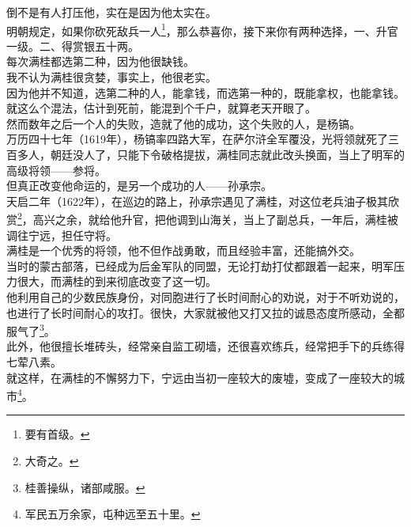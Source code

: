 \begin{multicols}{\theparacolNo}
倒不是有人打压他，实在是因为他太实在。\\

明朝规定，如果你砍死敌兵一人\footnote{要有首级。}，那么恭喜你，接下来你有两种选择，一、升官一级。二、得赏银五十两。\\

每次满桂都选第二种，因为他很缺钱。\\

我不认为满桂很贪婪，事实上，他很老实。\\

因为他并不知道，选第二种的人，能拿钱，而选第一种的，既能拿权，也能拿钱。\\

就这么个混法，估计到死前，能混到个千户，就算老天开眼了。\\

然而数年之后一个人的失败，造就了他的成功，这个失败的人，是杨镐。\\

万历四十七年（1619年），杨镐率四路大军，在萨尔浒全军覆没，光将领就死了三百多人，朝廷没人了，只能下令破格提拔，满桂同志就此改头换面，当上了明军的高级将领——参将。\\

但真正改变他命运的，是另一个成功的人——孙承宗。\\

天启二年（1622年），在巡边的路上，孙承宗遇见了满桂，对这位老兵油子极其欣赏\footnote{大奇之。}，高兴之余，就给他升官，把他调到山海关，当上了副总兵，一年后，满桂被调往宁远，担任守将。\\

满桂是一个优秀的将领，他不但作战勇敢，而且经验丰富，还能搞外交。\\

当时的蒙古部落，已经成为后金军队的同盟，无论打劫打仗都跟着一起来，明军压力很大，而满桂的到来彻底改变了这一切。\\

他利用自己的少数民族身份，对同胞进行了长时间耐心的劝说，对于不听劝说的，也进行了长时间耐心的攻打。很快，大家就被他又打又拉的诚恳态度所感动，全都服气了\footnote{桂善操纵，诸部咸服。}。\\

此外，他很擅长堆砖头，经常亲自监工砌墙，还很喜欢练兵，经常把手下的兵练得七荤八素。\\

就这样，在满桂的不懈努力下，宁远由当初一座较大的废墟，变成了一座较大的城市\footnote{军民五万余家，屯种远至五十里。}。\\


\end{multicols}
